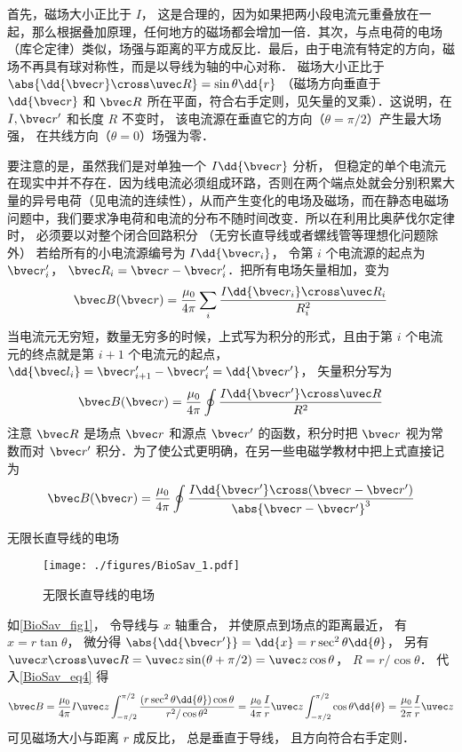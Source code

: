 首先，磁场大小正比于 $I$， 这是合理的，因为如果把两小段电流元重叠放在一起，那么根据叠加原理，任何地方的磁场都会增加一倍．其次，与点电荷的电场（库仑定律）类似，场强与距离的平方成反比．最后，由于电流有特定的方向，磁场不再具有球对称性，而是以导线为轴的中心对称． 磁场大小正比于 $\abs{\dd{\bvec r} \cross \uvec R} = \sin\theta \dd{r}$ （磁场方向垂直于 $\dd{\bvec r}$ 和 $\bvec R$ 所在平面，符合右手定则，见矢量的叉乘）．这说明，在 $I, \bvec r'$ 和长度 $R$ 不变时， 该电流源在垂直它的方向（$\theta  = \pi /2$）产生最大场强， 在共线方向（$\theta  = 0$）场强为零．

要注意的是，虽然我们是对单独一个 $I\dd{\bvec r}$ 分析， 但稳定的单个电流元在现实中并不存在．因为线电流必须组成环路，否则在两个端点处就会分别积累大量的异号电荷（见电流的连续性），从而产生变化的电场及磁场，而在静态电磁场问题中，我们要求净电荷和电流的分布不随时间改变．所以在利用比奥萨伐尔定律时， 必须要以对整个闭合回路积分 （无穷长直导线或者螺线管等理想化问题除外）%
若给所有的小电流源编号为 $I\dd{\bvec r_i}$， 令第 $i$ 个电流源的起点为 $\bvec r'_i$， $\bvec R_i = \bvec r - \bvec r'_i$．把所有电场矢量相加，变为
\begin{equation}
\bvec B (\bvec r) = \frac{\mu_0}{4\pi} \sum\limits_i \frac{I \dd{\bvec r_i} \cross \uvec R_i}{R_i^2}
\end{equation}
当电流元无穷短，数量无穷多的时候，上式写为积分的形式，且由于第 $i$ 个电流元的终点就是第 $i+1$ 个电流元的起点， $\dd{\bvec l_i} = \bvec r'_{i + 1} - \bvec r'_i = \dd{\bvec r'}$， 矢量积分写为
\begin{equation}\label{BioSav_eq4}
\bvec B (\bvec r) = \frac{\mu_0}{4\pi} \oint \frac{I\dd{\bvec r'} \cross \uvec R}{R^2}
\end{equation}
注意 $\bvec R$ 是场点 $\bvec r$ 和源点 $\bvec r'$ 的函数，积分时把 $\bvec r$ 视为常数而对 $\bvec r'$ 积分．为了使公式更明确，在另一些电磁学教材中把上式直接记为
\begin{equation}\label{BioSav_eq1}
\bvec B(\bvec r) = \frac{\mu_0}{4\pi} \oint \frac{I \dd{\bvec r'} \cross (\bvec r - \bvec r')}{\abs{\bvec r - \bvec r'}^3}
\end{equation}

\begin{example}{无限长直导线的电场}\label{BioSav_exe1}
\begin{figure}[ht]
\centering
\texttt{[image: ./figures/BioSav\_1.pdf]}
\caption{无限长直导线的电场} \label{BioSav_fig1}
\end{figure}
如\autoref{BioSav_fig1}， 令导线与 $x$ 轴重合， 并使原点到场点的距离最近， 有 $x = r\tan\theta$， 微分得 $\abs{\dd{\bvec r'}} = \dd{x} = r\sec^2\theta\dd{\theta}$， 另有 $\uvec x\cross\uvec R = \uvec z\sin(\theta + \pi/2) = \uvec z\cos\theta $， $R = r/\cos\theta$． 代入\autoref{BioSav_eq4} 得
\begin{equation}
\bvec B = \frac{\mu_0}{4\pi} I \uvec z\int_{-\pi/2}^{\pi/2} \frac{(r \sec^2\theta \dd{\theta}) \cos\theta}{r^2/\cos\theta^2}
= \frac{\mu_0}{4\pi} \frac Ir \uvec z\int_{-\pi/2}^{\pi/2} \cos\theta \dd{\theta}
= \frac{\mu_0}{2\pi} \frac Ir\uvec z
\end{equation}
可见磁场大小与距离 $r$ 成反比， 总是垂直于导线， 且方向符合右手定则．
\end{example}

